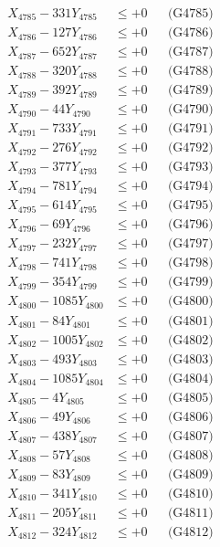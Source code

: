 \documentclass[a4paper,10pt]{article}
\begin{document}
{\begin{align}
X_{4785} - 331Y_{4785} &\leq +0 && \text{(G4785)} \\
X_{4786} - 127Y_{4786} &\leq +0 && \text{(G4786)} \\
X_{4787} - 652Y_{4787} &\leq +0 && \text{(G4787)} \\
X_{4788} - 320Y_{4788} &\leq +0 && \text{(G4788)} \\
X_{4789} - 392Y_{4789} &\leq +0 && \text{(G4789)} \\
X_{4790} - 44Y_{4790} &\leq +0 && \text{(G4790)} \\
\allowbreak
X_{4791} - 733Y_{4791} &\leq +0 && \text{(G4791)} \\
X_{4792} - 276Y_{4792} &\leq +0 && \text{(G4792)} \\
X_{4793} - 377Y_{4793} &\leq +0 && \text{(G4793)} \\
X_{4794} - 781Y_{4794} &\leq +0 && \text{(G4794)} \\
X_{4795} - 614Y_{4795} &\leq +0 && \text{(G4795)} \\
X_{4796} - 69Y_{4796} &\leq +0 && \text{(G4796)} \\
X_{4797} - 232Y_{4797} &\leq +0 && \text{(G4797)} \\
X_{4798} - 741Y_{4798} &\leq +0 && \text{(G4798)} \\
X_{4799} - 354Y_{4799} &\leq +0 && \text{(G4799)} \\
X_{4800} - 1085Y_{4800} &\leq +0 && \text{(G4800)} \\
\allowbreak
X_{4801} - 84Y_{4801} &\leq +0 && \text{(G4801)} \\
X_{4802} - 1005Y_{4802} &\leq +0 && \text{(G4802)} \\
X_{4803} - 493Y_{4803} &\leq +0 && \text{(G4803)} \\
X_{4804} - 1085Y_{4804} &\leq +0 && \text{(G4804)} \\
X_{4805} - 4Y_{4805} &\leq +0 && \text{(G4805)} \\
X_{4806} - 49Y_{4806} &\leq +0 && \text{(G4806)} \\
X_{4807} - 438Y_{4807} &\leq +0 && \text{(G4807)} \\
X_{4808} - 57Y_{4808} &\leq +0 && \text{(G4808)} \\
X_{4809} - 83Y_{4809} &\leq +0 && \text{(G4809)} \\
X_{4810} - 341Y_{4810} &\leq +0 && \text{(G4810)} \\
\allowbreak
X_{4811} - 205Y_{4811} &\leq +0 && \text{(G4811)} \\
X_{4812} - 324Y_{4812} &\leq +0 && \text{(G4812)} \\

\end{align}}
\end{document}
